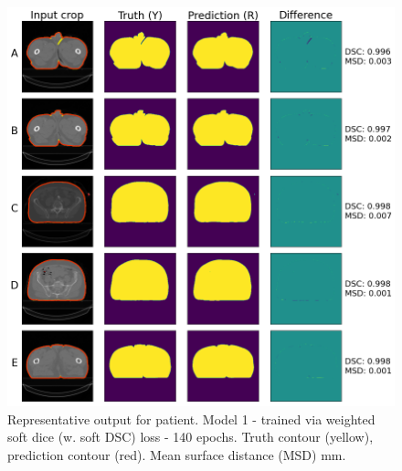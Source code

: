 \begin{figure}[H]
	\begin{center}
		\includegraphics[width=1.0\textwidth]{figures/prostate_patient}
		\caption{Representative output for patient. Model 1 - trained via weighted soft dice (w. soft DSC) loss - 140 epochs.  Truth contour (yellow), prediction contour (red). Mean surface distance (MSD) mm.}
		\label{fig:prostate_patient}
	\end{center}
\end{figure}



